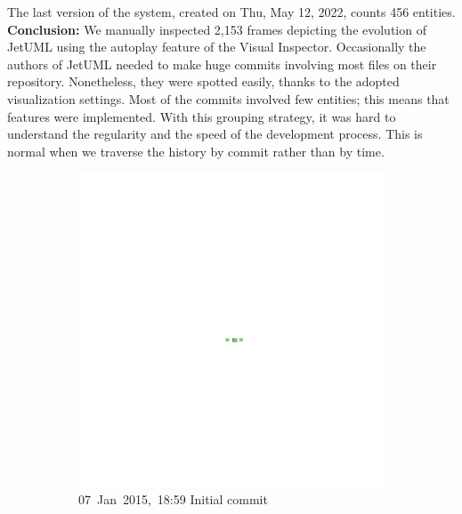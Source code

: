 The last version of the system, created on Thu, May 12, 2022, counts 456 entities. 
\bigbreak
\noindent
\textbf{Conclusion:}
We manually inspected 2,153 frames depicting the evolution of JetUML using the autoplay feature of the Visual Inspector.
Occasionally the authors of JetUML needed to make huge commits involving most files on their repository. Nonetheless, they were spotted easily, thanks to the adopted visualization settings. 
Most of the commits involved few entities; this means that features were implemented. 
With this grouping strategy, it was hard to understand the regularity and the speed of the development process. This is normal when we traverse the history by commit rather than by time. 

\begin{figure}[ht]
    \begin{subfigure}{0.32\textwidth}
        \includegraphics[width=\linewidth]{JetUML_V0S1.png}
        \caption{\mbox{07 Jan 2015, 18:59}  \hfill  \linebreak Initial commit} 
        \label{fig:JetUML_V0S1}
    \end{subfigure}
    \hspace*{\fill}
    \begin{subfigure}{0.32\textwidth}

\end{subfigure}
\end{figure}
